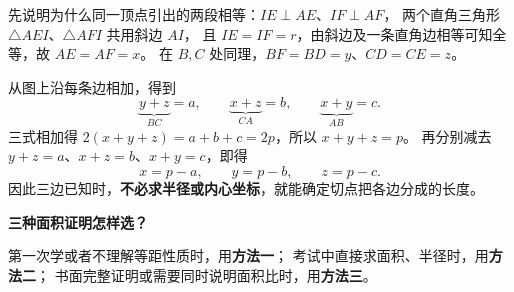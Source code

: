 \begin{proofbox}
\begin{minipage}{\linewidth}
\end{minipage}\par
先说明为什么同一顶点引出的两段相等：$IE\perp AE$、$IF\perp AF$，
两个直角三角形 $\triangle AEI$、$\triangle AFI$ 共用斜边 $AI$，
且 $IE=IF=r$，由斜边及一条直角边相等可知全等，故 $AE=AF=x$。
在 $B,C$ 处同理，$BF=BD=y$、$CD=CE=z$。

从图上沿每条边相加，得到
\[
 \underbrace{y+z}_{BC}=a,\qquad
 \underbrace{x+z}_{CA}=b,\qquad
 \underbrace{x+y}_{AB}=c.
\]
三式相加得 $2(x+y+z)=a+b+c=2p$，所以 $x+y+z=p$。
再分别减去 $y+z=a$、$x+z=b$、$x+y=c$，即得
\[
 \boxed{x=p-a},\qquad \boxed{y=p-b},\qquad \boxed{z=p-c}.
\]
因此三边已知时，\textbf{不必求半径或内心坐标}，就能确定切点把各边分成的长度。

\medskip
\textbf{\textcolor{CProof}{三种面积证明怎样选？}}

第一次学或者不理解等距性质时，用\textbf{方法一}；
考试中直接求面积、半径时，用\textbf{方法二}；
书面完整证明或需要同时说明面积比时，用\textbf{方法三}。
\end{proofbox}
